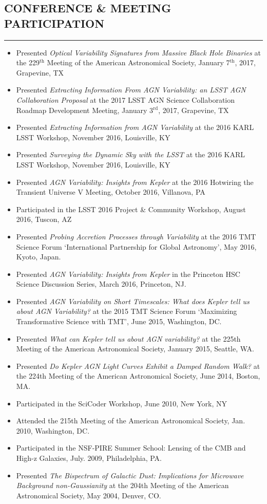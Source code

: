 \documentclass[10pt,a4]{article}
\newcounter{mySaveCounter}
\newcommand\myEnumReset{\setcounter{mySaveCounter}{0}}
\begin{document}
\subsection*{CONFERENCE \& MEETING PARTICIPATION}
\hrule  height 4pt
\vspace{0.2cm}
\begin{itemize}
    \item Presented {\it Optical Variability Signatures from Massive Black Hole Binaries} at the 229$^{\mathrm{th}}$ Meeting of the American Astronomical Society, January 7$^{\mathrm{th}}$, 2017, Grapevine, TX
    \item Presented {\it Extracting Information From AGN Variability: an LSST AGN Collaboration Proposal} at the 2017 LSST AGN Science Collaboration Roadmap Development Meeting, January 3$^{\mathrm{rd}}$, 2017, Grapevine, TX
    \item Presented {\it Extracting Information from AGN Variability} at the 2016 KARL LSST Workshop, November 2016, Louisville, KY
    \item Presented {\it Surveying the Dynamic Sky with the LSST} at the 2016 KARL LSST Workshop, November 2016, Louisville, KY
    \item Presented {\it AGN Variability: Insights from Kepler} at the 2016 Hotwiring the Transient Universe V Meeting, October 2016, Villanova, PA
    \item Participated in the LSST 2016 Project \& Community Workshop, August 2016, Tuscon, AZ
    \item Presented {\it Probing Accretion Processes through Variability} at the 2016 TMT Science Forum `International Partnership for Global Astronomy', May 2016, Kyoto, Japan.
    \item Presented {\it AGN Variability: Insights from Kepler} in the Princeton HSC Science Discussion Series, March 2016, Princeton, NJ.
    \item Presented {\it AGN Variability on Short Timescales: What does Kepler tell us about AGN Variability?} at the 2015 TMT Science Forum `Maximizing Transformative Science with TMT', June 2015, Washington, DC.
    \item Presented {\it What can Kepler tell us about AGN variability?} at the 225th Meeting of the American Astronomical Society, January 2015, Seattle, WA.
    \item Presented {\it Do Kepler AGN Light Curves Exhibit a Damped Random Walk?} at the 224th Meeting of the American Astronomical Society, June 2014, Boston, MA.
    \item Participated in the SciCoder Workshop, June 2010, New York, NY
    \item Attended the 215th Meeting of the American Astronomical Society, Jan. 2010, Washington, DC.
    \item Participated in the NSF-PIRE Summer School: Lensing of the CMB and High-z Galaxies, July. 2009, Philadelphia, PA.
    \item  Presented {\it The Bispectrum of Galactic Dust: Implications for Microwave Background non-Gaussianity} at the 204th Meeting of the American Astronomical Society, May 2004, Denver, CO.
\end{itemize}
\myEnumReset
\end{document}
